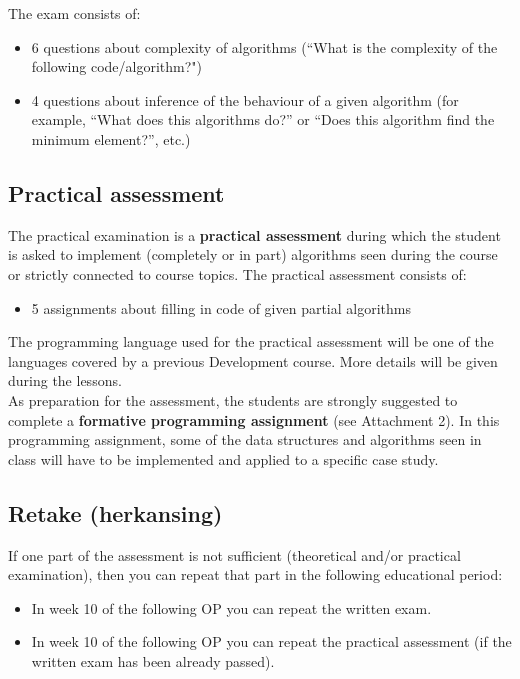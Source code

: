 	The exam consists of: 
	\begin{itemize}
		\item 6 questions about complexity of algorithms (``What is the complexity of the following code/algorithm?")
		\item 4 questions about inference of the behaviour of a given algorithm (for example, ``What does this algorithms do?\textquotedblright{} or ``Does this algorithm find the minimum element?\textquotedblright, etc.)
	\end{itemize}

	\subsection{Practical assessment}
	The practical examination is a \textbf{practical assessment} during which the student is asked to implement (completely or in part) algorithms seen during the course or strictly connected to course topics. The practical assessment consists of:
	\begin{itemize}
		\item 5 assignments about filling in code of given partial algorithms
	\end{itemize}
	
	The programming language used for the practical assessment will be one of the languages covered by a previous Development course. More details will be given during the lessons.\\
	
	As preparation for the assessment, the students are strongly suggested to complete a \textbf{formative programming assignment} (see Attachment 2). In this programming assignment, some of the data structures and algorithms seen in class will have to be implemented and applied to a specific case study.\\ 

	
	\subsection{Retake (herkansing)}
	If one part of the assessment is not sufficient (theoretical and/or practical examination), then you can repeat that part in the following educational period:
	\begin{itemize}
	\item In week 10 of the following OP you can repeat the written exam.
	\item In week 10 of the following OP you can repeat the practical assessment (if the written exam has been already passed).
	\end{itemize}
	
